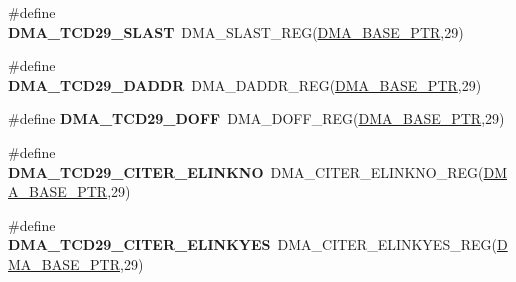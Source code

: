 \begin{DoxyCompactItemize}
\item 
\hypertarget{group___d_m_a___register___accessor___macros_ga5bdaa6cb602c1cffd9c97b15000d9f10}{}\#define {\bfseries D\+M\+A\+\_\+\+T\+C\+D29\+\_\+\+S\+L\+A\+S\+T}~D\+M\+A\+\_\+\+S\+L\+A\+S\+T\+\_\+\+R\+E\+G(\hyperlink{group___d_m_a___peripheral_ga6997fbc1b1973e9f27170217a3bd6f22}{D\+M\+A\+\_\+\+B\+A\+S\+E\+\_\+\+P\+T\+R},29)\label{group___d_m_a___register___accessor___macros_ga5bdaa6cb602c1cffd9c97b15000d9f10}

\item 
\hypertarget{group___d_m_a___register___accessor___macros_ga5593969a134bdb03ce84e1c4ac40108e}{}\#define {\bfseries D\+M\+A\+\_\+\+T\+C\+D29\+\_\+\+D\+A\+D\+D\+R}~D\+M\+A\+\_\+\+D\+A\+D\+D\+R\+\_\+\+R\+E\+G(\hyperlink{group___d_m_a___peripheral_ga6997fbc1b1973e9f27170217a3bd6f22}{D\+M\+A\+\_\+\+B\+A\+S\+E\+\_\+\+P\+T\+R},29)\label{group___d_m_a___register___accessor___macros_ga5593969a134bdb03ce84e1c4ac40108e}

\item 
\hypertarget{group___d_m_a___register___accessor___macros_gad72e2e6f6c98ec496bee5247c674e030}{}\#define {\bfseries D\+M\+A\+\_\+\+T\+C\+D29\+\_\+\+D\+O\+F\+F}~D\+M\+A\+\_\+\+D\+O\+F\+F\+\_\+\+R\+E\+G(\hyperlink{group___d_m_a___peripheral_ga6997fbc1b1973e9f27170217a3bd6f22}{D\+M\+A\+\_\+\+B\+A\+S\+E\+\_\+\+P\+T\+R},29)\label{group___d_m_a___register___accessor___macros_gad72e2e6f6c98ec496bee5247c674e030}

\item 
\hypertarget{group___d_m_a___register___accessor___macros_gaa09703f74756da785b131b9390e9fe13}{}\#define {\bfseries D\+M\+A\+\_\+\+T\+C\+D29\+\_\+\+C\+I\+T\+E\+R\+\_\+\+E\+L\+I\+N\+K\+N\+O}~D\+M\+A\+\_\+\+C\+I\+T\+E\+R\+\_\+\+E\+L\+I\+N\+K\+N\+O\+\_\+\+R\+E\+G(\hyperlink{group___d_m_a___peripheral_ga6997fbc1b1973e9f27170217a3bd6f22}{D\+M\+A\+\_\+\+B\+A\+S\+E\+\_\+\+P\+T\+R},29)\label{group___d_m_a___register___accessor___macros_gaa09703f74756da785b131b9390e9fe13}

\item 
\hypertarget{group___d_m_a___register___accessor___macros_gacb28eb0b5306b69145c4c31095769919}{}\#define {\bfseries D\+M\+A\+\_\+\+T\+C\+D29\+\_\+\+C\+I\+T\+E\+R\+\_\+\+E\+L\+I\+N\+K\+Y\+E\+S}~D\+M\+A\+\_\+\+C\+I\+T\+E\+R\+\_\+\+E\+L\+I\+N\+K\+Y\+E\+S\+\_\+\+R\+E\+G(\hyperlink{group___d_m_a___peripheral_ga6997fbc1b1973e9f27170217a3bd6f22}{D\+M\+A\+\_\+\+B\+A\+S\+E\+\_\+\+P\+T\+R},29)\label{group___d_m_a___register___accessor___macros_gacb28eb0b5306b69145c4c31095769919}


\end{DoxyCompactItemize}

